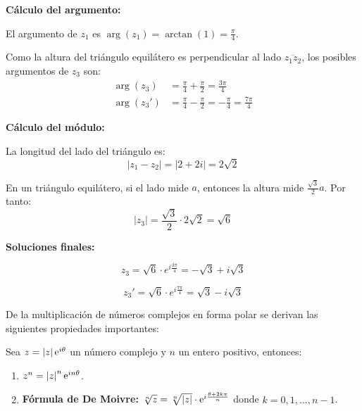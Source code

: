 \begin{myproof}
\textbf{Cálculo del argumento:}

El argumento de $z_1$ es $\arg(z_1) = \arctan(1) = \frac{\pi}{4}$. 

Como la altura del triángulo equilátero es perpendicular al lado $\overline{z_1z_2}$, los posibles argumentos de $z_3$ son:
\begin{align}
\arg(z_3) &= \frac{\pi}{4} + \frac{\pi}{2} = \frac{3\pi}{4}\\
\arg(z_3') &= \frac{\pi}{4} - \frac{\pi}{2} = -\frac{\pi}{4} = \frac{7\pi}{4}
\end{align}

\textbf{Cálculo del módulo:}

La longitud del lado del triángulo es:
$$|z_1 - z_2| = |2 + 2i| = 2\sqrt{2}$$

En un triángulo equilátero, si el lado mide $a$, entonces la altura mide $\frac{\sqrt{3}}{2}a$. Por tanto:
$$|z_3| = \frac{\sqrt{3}}{2} \cdot 2\sqrt{2} = \sqrt{6}$$

\textbf{Soluciones finales:}

$$\boxed{z_3 = \sqrt{6} \cdot e^{i\frac{3\pi}{4}} = -\sqrt{3} + i\sqrt{3}}$$

$$\boxed{z_3' = \sqrt{6} \cdot e^{i\frac{7\pi}{4}} = \sqrt{3} - i\sqrt{3}}$$

\end{myproof}

De la multiplicación de números complejos en forma polar se derivan las siguientes propiedades importantes:

\begin{theorem} Sea $z=\left\vert z\right\vert\mathrm{e}^{i\theta}$ un número complejo y $n$ un entero positivo, entonces:
\begin{enumerate}[$1.$]
\item $z^{n}=\left\vert z\right\vert^n\mathrm{e}^{in\theta}$.
\item \textbf{Fórmula de De Moivre:} $\sqrt[n]{z}=\sqrt[n]{\left\vert z\right\vert}\cdot \mathrm{e}^{i\frac{\theta+2k\pi}{n}}$ donde $k=0,1,\dots , n-1$.
\end{enumerate}
\end{theorem}

